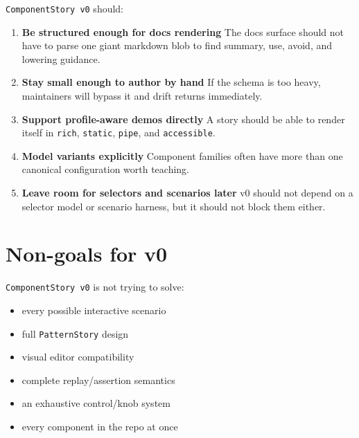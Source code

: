 \texttt{C\allowbreak{}o\allowbreak{}m\allowbreak{}p\allowbreak{}o\allowbreak{}n\allowbreak{}e\allowbreak{}n\allowbreak{}t\allowbreak{}S\allowbreak{}t\allowbreak{}o\allowbreak{}r\allowbreak{}y\allowbreak{} \allowbreak{}v\allowbreak{}0} should:

\begin{enumerate}
\def\labelenumi{\arabic{enumi}.}
\item
  \textbf{Be structured enough for docs rendering} The docs surface should not have to parse one giant markdown blob to find summary, use, avoid, and lowering guidance.
\item
  \textbf{Stay small enough to author by hand} If the schema is too heavy, maintainers will bypass it and drift returns immediately.
\item
  \textbf{Support profile-aware demos directly} A story should be able to render itself in \texttt{r\allowbreak{}i\allowbreak{}c\allowbreak{}h}, \texttt{s\allowbreak{}t\allowbreak{}a\allowbreak{}t\allowbreak{}i\allowbreak{}c}, \texttt{p\allowbreak{}i\allowbreak{}p\allowbreak{}e}, and \texttt{a\allowbreak{}c\allowbreak{}c\allowbreak{}e\allowbreak{}s\allowbreak{}s\allowbreak{}i\allowbreak{}b\allowbreak{}l\allowbreak{}e}.
\item
  \textbf{Model variants explicitly} Component families often have more than one canonical configuration worth teaching.
\item
  \textbf{Leave room for selectors and scenarios later} v0 should not depend on a selector model or scenario harness, but it should not block them either.
\end{enumerate}

\section{Non-goals for v0}\label{record-039-non-goals-for-v0}

\texttt{C\allowbreak{}o\allowbreak{}m\allowbreak{}p\allowbreak{}o\allowbreak{}n\allowbreak{}e\allowbreak{}n\allowbreak{}t\allowbreak{}S\allowbreak{}t\allowbreak{}o\allowbreak{}r\allowbreak{}y\allowbreak{} \allowbreak{}v\allowbreak{}0} is not trying to solve:

\begin{itemize}
\tightlist
\item
  every possible interactive scenario
\item
  full \texttt{P\allowbreak{}a\allowbreak{}t\allowbreak{}t\allowbreak{}e\allowbreak{}r\allowbreak{}n\allowbreak{}S\allowbreak{}t\allowbreak{}o\allowbreak{}r\allowbreak{}y} design
\item
  visual editor compatibility
\item
  complete replay/assertion semantics
\item
  an exhaustive control/knob system
\item
  every component in the repo at once
\end{itemize}

